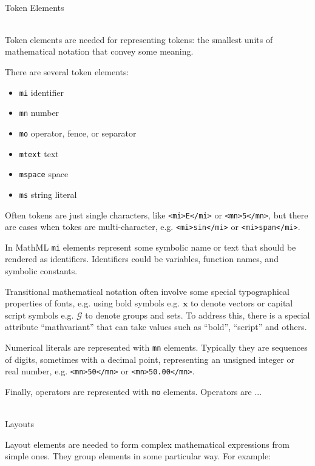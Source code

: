 \ \\


Token Elements

\ \\

Token elements are needed for representing tokens: the smallest units of
mathematical notation that convey some meaning.

There are several token elements:

\begin{itemize}
\itemsep1pt\parskip0pt
\item   \texttt{mi} identifier
\item   \texttt{mn} number
\item   \texttt{mo} operator, fence, or separator
\item   \texttt{mtext} text
\item   \texttt{mspace} space
\item   \texttt{ms} string literal
\end{itemize}

Often tokens are just single characters, like
\texttt{<mi>E</mi>} or
\texttt{<mn>5</mn>}, but
there are cases when tokes are multi-character, e.g.
\texttt{<mi>sin</mi>} or
\texttt{<mi>span</mi>}.

In MathML \texttt{mi} elements represent some symbolic name or text that
should be rendered as identifiers. Identifiers could be variables,
function names, and symbolic constants.

Transitional mathematical notation often involve some special
typographical properties of fonts, e.g. using bold symbols e.g.
$\mathbf x$ to denote vectors or capital script symbols
e.g. $\mathcal G$ to denote groups and sets. To address
this, there is a special attribute ``mathvariant'' that can take values
such as ``bold'', ``script'' and others.

Numerical literals are represented with \texttt{mn} elements. Typically
they are sequences of digits, sometimes with a decimal point,
representing an unsigned integer or real number, e.g.
\texttt{<mn>50</mn>} or
\texttt{<mn>50.00</mn>}.

Finally, operators are represented with \texttt{mo} elements. Operators
are ...


\ \\

Layouts

Layout elements are needed to form complex mathematical expressions from
simple ones. They group elements in some particular way. For example:

